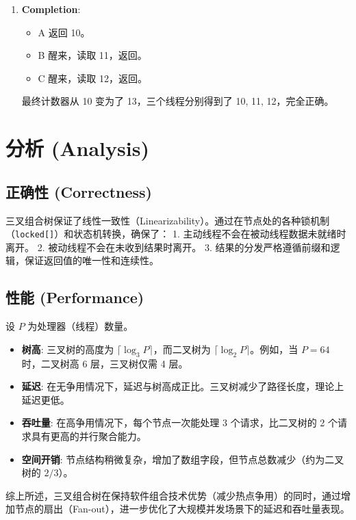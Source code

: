 \documentclass[UTF8,a4paper,12pt]{ctexart}
\begin{document}
\begin{enumerate}
    \item \textbf{Completion}:
    \begin{itemize}
        \item A 返回 10。
        \item B 醒来，读取 11，返回。
        \item C 醒来，读取 12，返回。
    \end{itemize}
    最终计数器从 10 变为了 13，三个线程分别得到了 10, 11, 12，完全正确。
\end{enumerate}

\section{分析 (Analysis)}

\subsection{正确性 (Correctness)}
三叉组合树保证了线性一致性（Linearizability）。通过在节点处的各种锁机制（\texttt{locked[]}）和状态机转换，确保了：
1. 主动线程不会在被动线程数据未就绪时离开。
2. 被动线程不会在未收到结果时离开。
3. 结果的分发严格遵循前缀和逻辑，保证返回值的唯一性和连续性。

\subsection{性能 (Performance)}
设 $P$ 为处理器（线程）数量。
\begin{itemize}
    \item \textbf{树高}: 三叉树的高度为 $\lceil \log_3 P \rceil$，而二叉树为 $\lceil \log_2 P \rceil$。例如，当 $P=64$ 时，二叉树高 6 层，三叉树仅需 4 层。
    \item \textbf{延迟}: 在无争用情况下，延迟与树高成正比。三叉树减少了路径长度，理论上延迟更低。
    \item \textbf{吞吐量}: 在高争用情况下，每个节点一次能处理 3 个请求，比二叉树的 2 个请求具有更高的并行聚合能力。
    \item \textbf{空间开销}: 节点结构稍微复杂，增加了数组字段，但节点总数减少（约为二叉树的 $2/3$）。
\end{itemize}

综上所述，三叉组合树在保持软件组合技术优势（减少热点争用）的同时，通过增加节点的扇出（Fan-out），进一步优化了大规模并发场景下的延迟和吞吐量表现。
\end{document}
